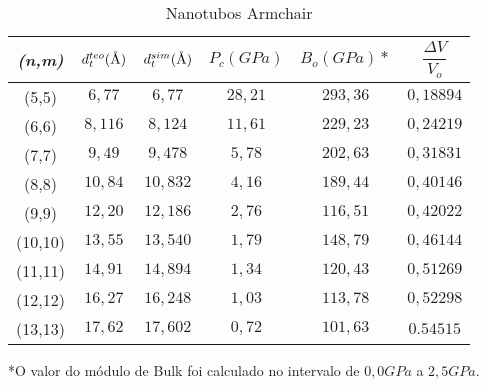 \documentclass[12pt,a4paper]{article}
\author{Antonio Lívio}
\newcommand{\angstrom}{\textup{\AA}}
\begin{document}
\begin{table}[h]
\centering
\caption{Nanotubos Armchair}
\begin{tabular}{|c|c|c|c|c|c|}
\hline
 
\textit{(n,m)} & $d_{t}^{teo}(\angstrom)$ & $d_{t}^{sim}(\angstrom)$ & $P_{c}(GPa)$ & $B_{o}(GPa)*$ & $\dfrac{\Delta V}{V_{o}}$ \\ 
\hline 


(5,5) & $6,77$ & $6,77$ & $28,21$ & $293,36$ & $0,18894$ \\ 
\hline
 
(6,6) & $8,116$ & $8,124$ & $11,61$ & $229,23$ & $0,24219$ \\ 
\hline
 
(7,7) & $9,49$ & $9,478$ & $5,78$ & $202,63$ & $0,31831$ \\ 
\hline
 
(8,8) & $10,84$ & $10,832$ & $4,16$ & $189,44$ & $0,40146$ \\ 
\hline
 
(9,9) & $12,20$ & $12,186$ & $2,76$ & $116,51$ & $0,42022$ \\ 
\hline
 
(10,10) & $13,55$ & $13,540$ & $1,79$ & $148,79$ & $0,46144$ \\ 
\hline
 
(11,11) & $14,91$ & $14,894$ & $1,34$ & $120,43$ & $0,51269$ \\ 
\hline

(12,12) & $16,27$ & $16,248$ & $1,03$ & $113,78$ & $0,52298$ \\ 
\hline

(13,13) & $17,62$ & $17,602$ & $0,72$ & $101,63$ & $0.54515$ \\ 
\hline


\end{tabular} 
\end{table}
\begin{small}
*O valor do módulo de Bulk foi calculado no intervalo de $0,0GPa$ a $2,5GPa$.
\end{small}
\end{document}
